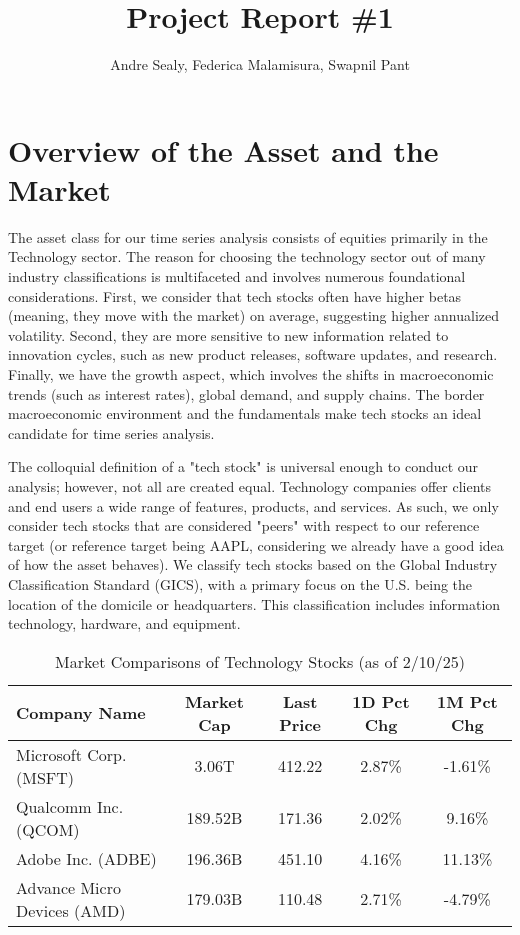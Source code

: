 \documentclass[12pt]{article}
\title{Project Report \#1}
\author{Andre Sealy, Federica Malamisura, Swapnil Pant}
\begin{document}
	
\maketitle

\section{Overview of the Asset and the Market}

The asset class for our time series analysis consists of equities primarily in the Technology sector. The reason for choosing the technology sector out of many industry classifications is multifaceted and involves numerous foundational considerations. First, we consider that tech stocks often have higher betas (meaning, they move with the market) on average, suggesting higher annualized volatility. Second, they are more sensitive to new information related to innovation cycles, such as new product releases, software updates, and research. Finally, we have the growth aspect, which involves the shifts in macroeconomic trends (such as interest rates), global demand, and supply chains. The border macroeconomic environment and the fundamentals make tech stocks an ideal candidate for time series analysis.

The colloquial definition of a "tech stock" is universal enough to conduct our analysis; however, not all are created equal. Technology companies offer clients and end users a wide range of features, products, and services. As such, we only consider tech stocks that are considered "peers" with respect to our reference target (or reference target being AAPL, considering we already have a good idea of how the asset behaves). We classify tech stocks based on the Global Industry Classification Standard (GICS), with a primary focus on the U.S. being the location of the domicile or headquarters. This classification includes information technology, hardware, and equipment.

\begin{table}[ht]
	\centering
	\caption{Market Comparisons of Technology Stocks (as of 2/10/25)}
	\begin{tabular}[t]{lcccc}
		\toprule
		Company Name & Market Cap & Last Price & 1D Pct Chg& 1M Pct Chg \\
		\midrule
		Microsoft Corp. (MSFT) & 3.06T &412.22&2.87\%&-1.61\%  \\
		Qualcomm Inc. (QCOM) & 189.52B &171.36&2.02\%&9.16\%  \\
		Adobe Inc. (ADBE) & 196.36B	&451.10&4.16\%&11.13\% \\	   
		Advance Micro Devices (AMD) & 179.03B&110.48&2.71\%&-4.79\% \\				   
		\bottomrule
	\end{tabular}\label{tab:market_of_tech}
\end{table}
\end{document}
